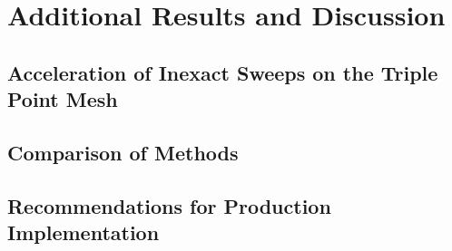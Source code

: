 \documentclass[../doc.tex]{subfiles}
\begin{document}
\chapter{Additional Results and Discussion}
\section{Acceleration of Inexact Sweeps on the Triple Point Mesh}

\section{Comparison of Methods}

\section{Recommendations for Production Implementation}
\end{document}
